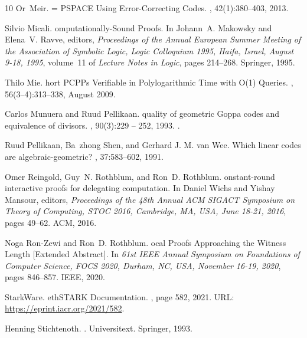 \documentclass[10pt,a4paper]{article}
\theoremstyle{plain}
\theoremstyle{plain}
\theoremstyle{definition}
\theoremstyle{remark}
\theoremstyle{plain}
\begin{document}
\begin{thebibliography}{10}
Or~Meir.
 = {{P}{S}{P}{A}{C}{E}} {U}sing {E}rror-{C}orrecting {C}odes.
, 42(1):380--403, 2013.

Silvio Micali.
omputationally-{S}ound {P}roofs.
\newblock In Johann~A. Makowsky and Elena~V. Ravve, editors, {\em Proceedings
  of the Annual European Summer Meeting of the Association of Symbolic Logic,
  Logic Colloquium 1995, Haifa, Israel, August 9-18, 1995}, volume~11 of {\em
  Lecture Notes in Logic}, pages 214--268. Springer, 1995.

Thilo Mie.
hort {P}{C}{P}{P}s {V}erifiable in {P}olylogarithmic {T}ime with
  {O}(1) {Q}ueries.
,
  56(3–4):313–338, August 2009.

Carlos Munuera and Ruud Pellikaan.
quality of geometric {G}oppa codes and equivalence of divisors.
, 90(3):229 -- 252, 1993.
\newblock \href {https://doi.org/10.1016/0022-4049(93)90043-S}
  {}.

Ruud {Pellikaan}, Ba~zhong {Shen}, and Gerhard {J. M. van Wee}.
\newblock Which linear codes are algebraic-geometric?
, 37:583--602, 1991.

Omer Reingold, Guy~N. Rothblum, and Ron~D. Rothblum.
onstant-round interactive proofs for delegating computation.
\newblock In Daniel Wichs and Yishay Mansour, editors, {\em Proceedings of the
  48th Annual {ACM} {SIGACT} Symposium on Theory of Computing, {STOC} 2016,
  Cambridge, MA, USA, June 18-21, 2016}, pages 49--62. {ACM}, 2016.

Noga Ron{-}Zewi and Ron~D. Rothblum.
ocal {P}roofs {A}pproaching the {W}itness {L}ength [{E}xtended
  {A}bstract].
\newblock In {\em 61st {IEEE} Annual Symposium on Foundations of Computer
  Science, {FOCS} 2020, Durham, NC, USA, November 16-19, 2020}, pages 846--857.
  {IEEE}, 2020.

StarkWare.
\newblock eth{S}{T}{A}{R}{K} {D}ocumentation.
, page 582, 2021.
\newblock URL: \url{https://eprint.iacr.org/2021/582}.

Henning Stichtenoth.
.
\newblock Universitext. Springer, 1993.


\end{thebibliography}
\end{document}
